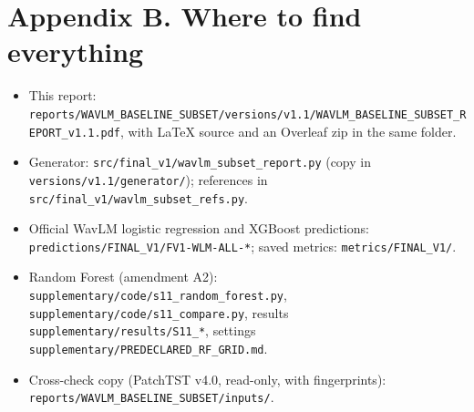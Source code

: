 \documentclass[11pt,a4paper]{article}
\begin{document}
\section*{Appendix B. Where to find everything}
\begin{itemize}\item This report: \texttt{reports/WAVLM\_\allowbreak{}BASELINE\_\allowbreak{}SUBSET/versions/v1.1/WAVLM\_\allowbreak{}BASELINE\_\allowbreak{}SUBSET\_\allowbreak{}REPORT\_\allowbreak{}v1.1.pdf}, with LaTeX source and an Overleaf zip in the same folder.
\item Generator: \texttt{src/final\_\allowbreak{}v1/wavlm\_\allowbreak{}subset\_\allowbreak{}report.py} (copy in \texttt{versions/v1.1/generator/}); references in \texttt{src/final\_\allowbreak{}v1/wavlm\_\allowbreak{}subset\_\allowbreak{}refs.py}.
\item Official WavLM logistic regression and XGBoost predictions: \texttt{predictions/FINAL\_\allowbreak{}V1/FV1-WLM-ALL-*}; saved metrics: \texttt{metrics/FINAL\_\allowbreak{}V1/}.
\item Random Forest (amendment A2): \texttt{supplementary/code/s11\_\allowbreak{}random\_\allowbreak{}forest.py}, \texttt{supplementary/code/s11\_\allowbreak{}compare.py}, results \texttt{supplementary/results/S11\_\allowbreak{}*}, settings \texttt{supplementary/PREDECLARED\_\allowbreak{}RF\_\allowbreak{}GRID.md}.
\item Cross-check copy (PatchTST v4.0, read-only, with fingerprints): \texttt{reports/WAVLM\_\allowbreak{}BASELINE\_\allowbreak{}SUBSET/inputs/}.
\end{itemize}
\end{document}
